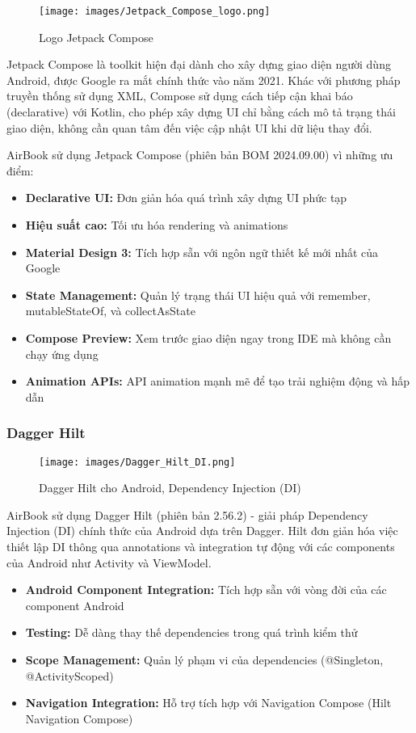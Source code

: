 \begin{figure}[H]
\centering
\texttt{[image: images/Jetpack\_Compose\_logo.png]}
\caption{Logo Jetpack Compose}
\end{figure}

Jetpack Compose là toolkit hiện đại dành cho xây dựng giao diện người dùng Android, được Google ra mắt chính thức vào năm 2021. Khác với phương pháp truyền thống sử dụng XML, Compose sử dụng cách tiếp cận khai báo (declarative) với Kotlin, cho phép xây dựng UI chỉ bằng cách mô tả trạng thái giao diện, không cần quan tâm đến việc cập nhật UI khi dữ liệu thay đổi.

AirBook sử dụng Jetpack Compose (phiên bản BOM 2024.09.00) vì những ưu điểm:

\begin{itemize}[leftmargin=1cm]
    \item \textbf{Declarative UI:} Đơn giản hóa quá trình xây dựng UI phức tạp
    \item \textbf{Hiệu suất cao:} Tối ưu hóa rendering và animations
    \item \textbf{Material Design 3:} Tích hợp sẵn với ngôn ngữ thiết kế mới nhất của Google
    \item \textbf{State Management:} Quản lý trạng thái UI hiệu quả với remember, mutableStateOf, và collectAsState
    \item \textbf{Compose Preview:} Xem trước giao diện ngay trong IDE mà không cần chạy ứng dụng
    \item \textbf{Animation APIs:} API animation mạnh mẽ để tạo trải nghiệm động và hấp dẫn
\end{itemize}

\subsubsection{Dagger Hilt}

\begin{figure}[H]
\centering
\texttt{[image: images/Dagger\_Hilt\_DI.png]}
\caption{Dagger Hilt cho Android, Dependency Injection (DI)}
\end{figure}

AirBook sử dụng Dagger Hilt (phiên bản 2.56.2) - giải pháp Dependency Injection (DI) chính thức của Android dựa trên Dagger. Hilt đơn giản hóa việc thiết lập DI thông qua annotations và integration tự động với các components của Android như Activity và ViewModel.

\begin{itemize}[leftmargin=1cm]
    \item \textbf{Android Component Integration:} Tích hợp sẵn với vòng đời của các component Android
    \item \textbf{Testing:} Dễ dàng thay thế dependencies trong quá trình kiểm thử
    \item \textbf{Scope Management:} Quản lý phạm vi của dependencies (@Singleton, @ActivityScoped)
    \item \textbf{Navigation Integration:} Hỗ trợ tích hợp với Navigation Compose (Hilt Navigation Compose)
\end{itemize}


